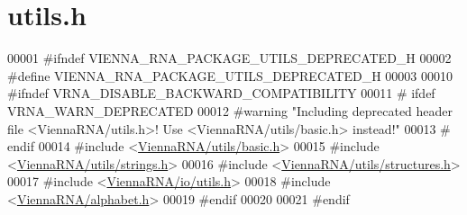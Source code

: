 \hypertarget{utils_8h_source}{}\section{utils.\+h}
\label{utils_8h_source}

\begin{DoxyCode}
00001 \textcolor{preprocessor}{#ifndef VIENNA\_RNA\_PACKAGE\_UTILS\_DEPRECATED\_H}
00002 \textcolor{preprocessor}{#define VIENNA\_RNA\_PACKAGE\_UTILS\_DEPRECATED\_H}
00003 
00010 \textcolor{preprocessor}{#ifndef VRNA\_DISABLE\_BACKWARD\_COMPATIBILITY}
00011 \textcolor{preprocessor}{# ifdef VRNA\_WARN\_DEPRECATED}
00012 \textcolor{preprocessor}{#warning "Including deprecated header file <ViennaRNA/utils.h>! Use <ViennaRNA/utils/basic.h> instead!"}
00013 \textcolor{preprocessor}{# endif}
00014 \textcolor{preprocessor}{#include <\hyperlink{utils_2basic_8h}{ViennaRNA/utils/basic.h}>}
00015 \textcolor{preprocessor}{#include <\hyperlink{strings_8h}{ViennaRNA/utils/strings.h}>}
00016 \textcolor{preprocessor}{#include <\hyperlink{utils_2structures_8h}{ViennaRNA/utils/structures.h}>}
00017 \textcolor{preprocessor}{#include <\hyperlink{io_2utils_8h}{ViennaRNA/io/utils.h}>}
00018 \textcolor{preprocessor}{#include <\hyperlink{alphabet_8h}{ViennaRNA/alphabet.h}>}
00019 \textcolor{preprocessor}{#endif}
00020 
00021 \textcolor{preprocessor}{#endif}
\end{DoxyCode}
